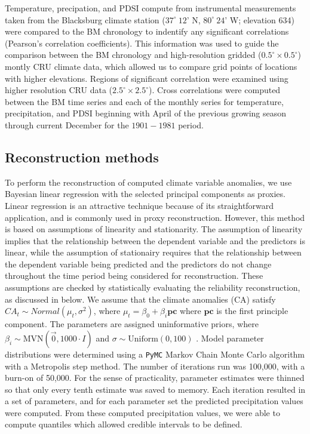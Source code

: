\documentclass[11pt]{article}
\begin{document}
Temperature, precipation, and PDSI compute from instrumental measurements taken from the Blacksburg climate station ($37^{\circ} \ 12$' N, $80^{\circ}\ 24$' W; elevation 634) were compared to the BM chronology to indentify any significant correlations (Pearson's correlation coefficients). This information was used to guide the comparison between the BM chronology and high-resolution gridded ($0.5^{\circ} \times 0.5^{\circ}$) montly CRU climate data, which allowed us to compare grid points of locations with higher elevations. Regions of significant correlation were examined using higher resolution CRU data ($2.5^{\circ} \times 2.5^{\circ}$). Cross correlations were computed between the BM time series and each of the monthly series for temperature, precipitation, and PDSI beginning with April of the previous growing season through current December for the $1901 - 1981$ period.

\subsection{Reconstruction methods}

To perform the reconstruction of computed climate variable anomalies, we use Bayesian linear regression with the selected principal components as proxies. Linear regression is an attractive technique because of its straightforward application, and is commonly used in proxy reconstruction. However, this method is based on assumptions of linearity and stationarity. The assumption of linearity implies that the relationship between the dependent variable and the predictors is linear, while the assumption of stationairy requires that the relationship between the dependent variable being predicted and the predictors do not change throughout the time period being considered for reconstruction. These assumptions are checked by statistically evaluating the reliability reconstruction, as discussed in below. We assume that the climate anomalies (CA) satisfy $CA_t \sim Normal( \mu_t, \sigma^2)$, where $\mu_t = \beta_0 + \beta_i \mathbf{pc}$ where $\mathbf{pc}$ is the first principle component. The parameters are assigned uninformative priors, where $\beta_i \sim \text{MVN}(\vec{0},1000\cdot I)$ and $\sigma \sim \text{Uniform}(0,100)$ . Model parameter distributions were determined using a \texttt{PyMC} Markov Chain Monte Carlo algorithm with a Metropolis step method. The number of iterations run was 100,000, with a burn-on of 50,000. For the sense of practicality, parameter estimates were thinned so that only every tenth estimate was saved to memory. Each iteration resulted in a set of parameters, and for each parameter set the predicted precipitation values were computed. From these computed precipitation values, we were able to compute quantiles which allowed credible intervals to be defined.
\end{document}

